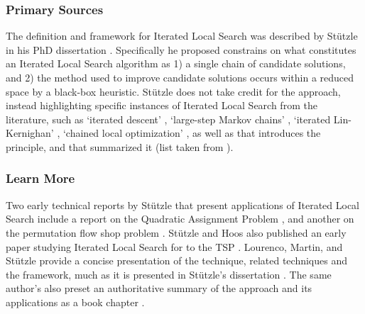 \subsubsection{Primary Sources}
The definition and framework for Iterated Local Search was described by St\"utzle in his PhD dissertation \cite{Stutzle1998}. Specifically he proposed constrains on what constitutes an Iterated Local Search algorithm as 1) a single chain of candidate solutions, and 2) the method used to improve candidate solutions occurs within a reduced space by a black-box heuristic.
St\"utzle does not take credit for the approach, instead highlighting specific instances of Iterated Local Search from the literature, such as `iterated descent' \cite{Baum1986}, `large-step Markov chains' \cite{Martin1991}, `iterated Lin-Kernighan' \cite{Johnson1990}, `chained local optimization' \cite{Martin1996}, as well as \cite{Baxter1981} that introduces the principle, and \cite{Johnson1997} that summarized it (list taken from \cite{Ramalhinho-Lourenco2003}).

% 
% 
\subsubsection{Learn More}
Two early technical reports by St\"utzle that present applications of Iterated Local Search include a report on the Quadratic Assignment Problem \cite{Stuetzle1999}, and another on the permutation flow shop problem \cite{Stutzle1998a}. St\"utzle and Hoos also published an early paper studying Iterated Local Search for to the TSP \cite{Stutzle1999}.
Lourenco, Martin, and St\"utzle provide a concise presentation of the technique, related techniques and the framework, much as it is presented in St\"utzle's dissertation \cite{Lourenco2001}.
The same author's also preset an authoritative summary of the approach and its applications as a book chapter \cite{Ramalhinho-Lourenco2003}.


